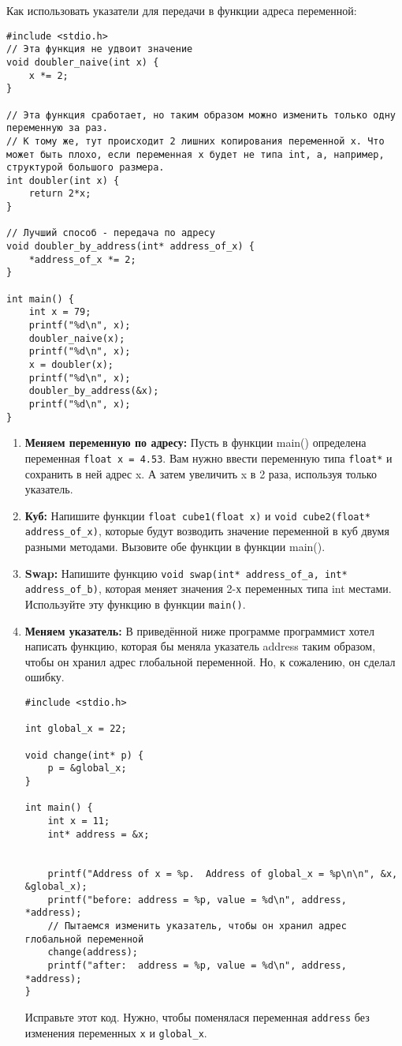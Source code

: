 \documentclass{article}
\begin{document}
\begin{enumerate}
Как использовать указатели для передачи в функции адреса переменной: 
\begin{lstlisting}
#include <stdio.h>
// Эта функция не удвоит значение
void doubler_naive(int x) {
	x *= 2;
}

// Эта функция сработает, но таким образом можно изменить только одну переменную за раз.
// К тому же, тут происходит 2 лишних копирования переменной x. Что может быть плохо, если переменная x будет не типа int, а, например, структурой большого размера.
int doubler(int x) {
	return 2*x;
}

// Лучший способ - передача по адресу
void doubler_by_address(int* address_of_x) {
	*address_of_x *= 2;
}

int main() {
	int x = 79;
	printf("%d\n", x);
	doubler_naive(x);
	printf("%d\n", x);
	x = doubler(x);
	printf("%d\n", x);
	doubler_by_address(&x);
	printf("%d\n", x);
}
\end{lstlisting}

\begin{enumerate}
\item \textbf{Меняем переменную по адресу:} Пусть в функции main() определена переменная \texttt{float\ x = 4.53}. Вам нужно ввести переменную типа \texttt{float*} и сохранить в ней адрес x. А затем увеличить x в 2 раза, используя только указатель.
\item \textbf{Куб:} Напишите функции \texttt{float cube1(float x)} и \texttt{void cube2(float* address\_of\_x)}, которые будут возводить значение переменной в куб двумя разными методами. Вызовите обе функции в функции main(). 
\item \textbf{Swap:} Напишите функцию \texttt{void swap(int* address\_of\_a, int* address\_of\_b)}, которая меняет значения 2-х переменных типа int местами. Используйте эту функцию в функции \texttt{main()}. 

\item \textbf{Меняем указатель:} 
В приведённой ниже программе программист хотел написать функцию, которая бы меняла указатель address таким образом, чтобы он хранил адрес глобальной переменной. Но, к сожалению, он сделал ошибку.
\begin{lstlisting}
#include <stdio.h>

int global_x = 22; 

void change(int* p) { 
    p = &global_x; 
} 
  
int main() { 
    int x = 11; 
    int* address = &x;
  
    
    printf("Address of x = %p.  Address of global_x = %p\n\n", &x, &global_x);
    printf("before: address = %p, value = %d\n", address, *address);
    // Пытаемся изменить указатель, чтобы он хранил адрес глобальной переменной
    change(address);
    printf("after:  address = %p, value = %d\n", address, *address);
} 
\end{lstlisting}
Исправьте этот код. Нужно, чтобы поменялася переменная \texttt{address} без изменения переменных \texttt{x} и \texttt{global\_x}.
\end{enumerate}


\end{enumerate}
\end{document}
